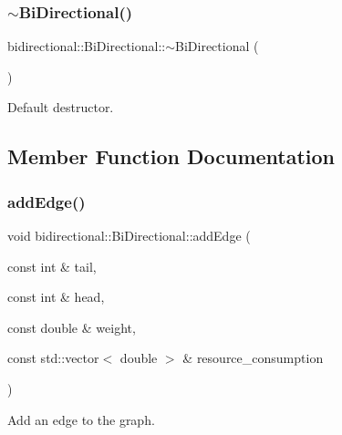 \subsubsection{\texorpdfstring{$\sim$\+Bi\+Directional()}{~BiDirectional()}}
{\footnotesize\ttfamily bidirectional\+::\+Bi\+Directional\+::$\sim$\+Bi\+Directional (\begin{DoxyParamCaption}{ }\end{DoxyParamCaption})\hspace{0.3cm}{\ttfamily [inline]}}



Default destructor. 



\subsection{Member Function Documentation}
\mbox{\label{classbidirectional_1_1BiDirectional_a5e4873f624300e7c3620e00758c98a35}} 
\subsubsection{\texorpdfstring{add\+Edge()}{addEdge()}}
{\footnotesize\ttfamily void bidirectional\+::\+Bi\+Directional\+::add\+Edge (\begin{DoxyParamCaption}\item[{const int \&}]{tail,  }\item[{const int \&}]{head,  }\item[{const double \&}]{weight,  }\item[{const std\+::vector$<$ double $>$ \&}]{resource\+\_\+consumption }\end{DoxyParamCaption})\hspace{0.3cm}{\ttfamily [inline]}}



Add an edge to the graph. 

\mbox{\label{classbidirectional_1_1BiDirectional_a37633f0f701bfb6a5f3a212212316f29}} 
